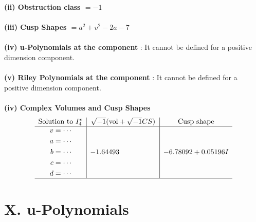 \documentclass[1p]{elsarticle_modified}
\theoremstyle{definition}
\newcommand{\I}{\sqrt{-1}}
\begin{document}
\flushleft \textbf{(ii) Obstruction class $= -1$}\\~\\
\flushleft \textbf{(iii) Cusp Shapes $= a^2+v^2-2 a-7$}\\~\\
\flushleft \textbf{(iv) u-Polynomials at the component} : It cannot be defined for a positive dimension component.\\~\\
\flushleft \textbf{(v) Riley Polynomials at the component} : It cannot be defined for a positive dimension component.\\~\\
\newpage\flushleft \textbf{(iv) Complex Volumes and Cusp Shapes}
$$\begin{array}{c|c|c} 
\text{Solution to }I^v_{4}& \I (\text{vol} + \sqrt{-1}CS) & \text{Cusp shape}\\
 \hline 
\begin{aligned}
v &= \cdots \\
a &= \cdots \\
b &= \cdots \\
c &= \cdots \\
d &= \cdots\end{aligned}
 & -1.64493\phantom{ +0.000000I} & -6.78092 + 0.05196 I\\
 \hline 
 \end{array}
$$
\newpage\renewcommand{\arraystretch}{1}
\centering \section*{ X. u-Polynomials}
\end{document}
